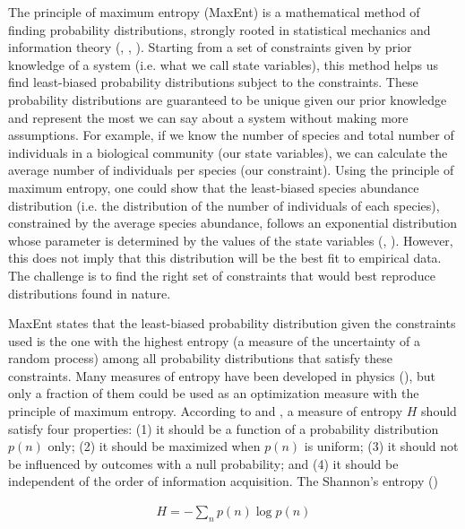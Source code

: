 The principle of maximum entropy (MaxEnt) is a mathematical method of finding
probability distributions, strongly rooted in statistical mechanics and
information theory (\cite{Jaynes1957Information}, \cite{Jaynes1957Informationa},
\cite{Harremoes2001Maximum}). Starting from a set of constraints given by prior
knowledge of a system (i.e. what we call state variables), this method helps us
find least-biased probability distributions subject to the constraints. These
probability distributions are guaranteed to be unique given our prior knowledge
and represent the most we can say about a system without making more
assumptions. For example, if we know the number of species and total number of
individuals in a biological community (our state variables), we can calculate
the average number of individuals per species (our constraint). Using the
principle of maximum entropy, one could show that the least-biased species
abundance distribution (i.e. the distribution of the number of individuals of
each species), constrained by the average species abundance, follows an
exponential distribution whose parameter is determined by the values of the
state variables (\cite{Frank2011Simple}, \cite{Harte2014Maximum}). However,
this does not imply that this distribution will be the best fit to empirical
data. The challenge is to find the right set of constraints that would best
reproduce distributions found in nature. 

MaxEnt states that the least-biased probability distribution given the
constraints used is the one with the highest entropy (a measure of the
uncertainty of a random process) among all probability distributions that
satisfy these constraints. Many measures of entropy have been developed in
physics (\cite{Beck2009Generalised}), but only a fraction of them could be used as
an optimization measure with the principle of maximum entropy. According to
\cite{Beck2009Generalised} and \cite{Khinchin2013Mathematical}, a measure of entropy $H$
should satisfy four properties: (1) it should be a function of a probability
distribution $p(n)$ only; (2) it should be maximized when $p(n)$ is uniform; (3)
it should not be influenced by outcomes with a null probability; and (4) it
should be independent of the order of information acquisition. The Shannon's
entropy (\cite{Shannon1948Mathematical})

\begin{eqnarray}
  \label{eq:shannon}
          H = -\sum_{n} p(n) \log p(n)
\end{eqnarray}

